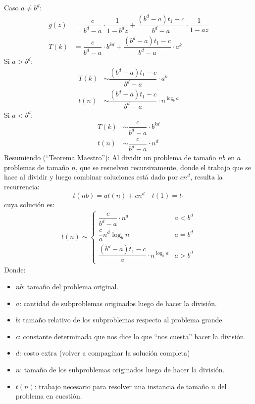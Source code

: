\documentclass[english, spanish, fleqn, 10pt]{article}
\newcommand{\comillas}[1]{``#1''}
\numberwithin{equation}{section}
\newcommand{\nparentesis}[1]{\left( #1 \right)}
\theoremstyle{definition}
\begin{document}
	Caso $a \ne b^d$:
	\begin{align*}
	g\nparentesis{z} &= \dfrac{c}{b^d -a}\cdot \dfrac{1}{1-b^d z} + \dfrac{\nparentesis{b^d -a} t_1 - c}{b^d -a} \cdot \dfrac{1}{1-az}\\
	T\nparentesis{k}&=\dfrac{c}{b^d -a} \cdot b^{kd} + \dfrac{\nparentesis{b^d -a}t_1 - c}{b^d -a} \cdot a^k
	\end{align*}
	Si $a > b^d$:
	\begin{align*}
	T\nparentesis{k} &\sim \dfrac{\nparentesis{b^d - a}t_1 - c}{b^d -a} \cdot a^k\\
	t\nparentesis{n} &\sim  \dfrac{\nparentesis{b^d - a}t_1 -c}{b^d -a} \cdot n^{\log_b a}
	\end{align*}
	Si $a < b^d$:
	\begin{align*}
	T\nparentesis{k} & \sim \dfrac{c}{b^d -a} \cdot b^{kd}\\
	t\nparentesis{n} &\sim \dfrac{c}{b^d -a}\cdot n^d
	\end{align*}
	Resumiendo (\comillas{Teorema Maestro}):
        Al dividir un problema de tamaño \(n b\)
        en \(a\) problemas de tamaño \(n\),
        que se resuelven recursivamente,
        donde el trabajo que se hace al dividir y luego combinar soluciones
        está dado por \(c n^d\),
        resulta la recurrencia:
        \begin{equation*}
          t\nparentesis{nb}= at\nparentesis{n} + cn^d
          \quad t(1) = t_1
        \end{equation*}
        cuya solución es:
        \begin{align*}
          t(n)
            \sim \begin{cases}
                   \dfrac{c}{b^d - a} \cdot n^d  & a < b^d \\[1em]
                   \dfrac{c}{a} n^d \log_b n     & a = b^d \\[1em]
                   \dfrac{(b^d - a) t_1 - c}{a} \cdot n^{\log_n a}
                                                & a > b^d
                 \end{cases}
        \end{align*}
    Donde:
    \begin{itemize}
    	\item $nb$: tamaño del problema original.
    	\item $a$: cantidad de subproblemas originados luego de hacer la división.
    	\item $b$: tamaño relativo de los subproblemas respecto al problema grande.
    	\item $c$: constante determinada que nos dice lo que \comillas{nos cuesta} hacer la división. 
    	\item $d$: costo extra (volver a compaginar la solución completa)
    	\item $n$: tamaño de los subproblemas originados luego de hacer la división.
    	\item $t\nparentesis{n}$: trabajo necesario para resolver una instancia de tamaño $n$ del problema en cuestión.
    \end{itemize}
        
\end{document}
